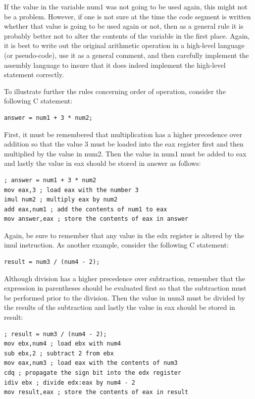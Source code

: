 \documentclass[10pt]{book}
\begin{document}
If the value in the variable num1 was not going to be used again, this might not be a problem. However, if one is not sure at the time the code segment is written whether that value is going to be used again or not, then as a general rule it is probably better not to alter the contents of the variable in the first place. Again, it is best to write out the original arithmetic operation in a high-level language (or pseudo-code), use it as a general comment, and then carefully implement the assembly language to insure that it does indeed implement the high-level statement correctly.

To illustrate further the rules concerning order of operation, consider the following C statement:


\begin{verbatim}
answer = num1 + 3 * num2;
\end{verbatim}

First, it must be remembered that multiplication has a higher precedence over addition so that the value 3 must be loaded into the eax register first and then multiplied by the value in num2. Then the value in num1 must be added to eax and lastly the value in eax should be stored in answer as follows:

\begin{verbatim}
; answer = num1 + 3 * num2
mov eax,3 ; load eax with the number 3
imul num2 ; multiply eax by num2
add eax,num1 ; add the contents of num1 to eax
mov answer,eax ; store the contents of eax in answer
\end{verbatim}

Again, be sure to remember that any value in the edx register is altered by the imul instruction. As another example, consider the following C statement:

\begin{verbatim}
result = num3 / (num4 - 2);
\end{verbatim}

Although division has a higher precedence over subtraction, remember that the expression in parentheses should be evaluated first so that the subtraction must be performed prior to the division. Then the value in num3 must be divided by the results of the subtraction and lastly the value in eax should be stored in result:

\begin{verbatim}
; result = num3 / (num4 - 2);
mov ebx,num4 ; load ebx with num4
sub ebx,2 ; subtract 2 from ebx
mov eax,num3 ; load eax with the contents of num3
cdq ; propagate the sign bit into the edx register
idiv ebx ; divide edx:eax by num4 - 2
mov result,eax ; store the contents of eax in result
\end{verbatim}
\end{document}
